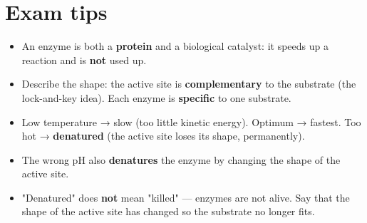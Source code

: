 \documentclass[11pt]{article}
\begin{document}
\section*{Exam tips}

\begin{itemize}
\item An enzyme is both a \textbf{protein} and a biological catalyst: it speeds up a reaction and is \textbf{not} used up.

\item Describe the shape: the active site is \textbf{complementary} to the substrate (the lock-and-key idea). Each enzyme is \textbf{specific} to one substrate.

\item Low temperature → slow (too little kinetic energy). Optimum → fastest. Too hot → \textbf{denatured} (the active site loses its shape, permanently).

\item The wrong pH also \textbf{denatures} the enzyme by changing the shape of the active site.

\item "Denatured" does \textbf{not} mean "killed" — enzymes are not alive. Say that the shape of the active site has changed so the substrate no longer fits.

\end{itemize}
\end{document}
